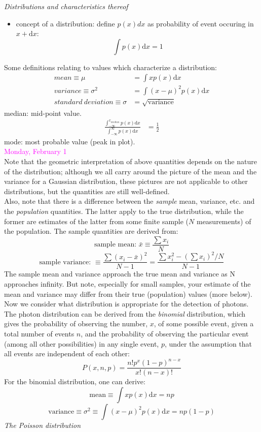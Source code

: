 \documentclass[12pt]{article}
\begin{document}
\noindent \emph{Distributions and characteristics thereof}
\begin{itemize}
    \item concept of a distribution: define $p(x)dx$ as probability of
    event occuring in $x + \textrm{d}x$:
        $$ \int p(x)\textrm{d}x = 1 $$
\end{itemize}
Some definitions relating to values which characterize a distribution:
\begin{align*}
    mean \equiv \mu &= \int xp(x)\textrm{d}x \\
    variance \equiv \sigma^2 &= \int (x-\mu)^2 p(x)\textrm{d}x \\
    standard\ deviation \equiv \sigma &= \sqrt{\textrm{variance}}
\end{align*}
median: mid-point value.
\begin{align*}
    \frac{ \int_{-\infty}^{x_{median}} p(x)\textrm{d}x }
    { \int_{-\infty}^{\infty} p(x)\textrm{d}x }
    &= \frac{1}{2}
\end{align*}
mode: most probable value (peak in plot).\\

\noindent \textcolor{magenta}{Monday, February 1}\\

\noindent Note that the geometric interpretation of above quantities
depends on the nature of the distribution; although we all carry
around the picture of the mean and the variance for a Gaussian
distribution, these pictures are not applicable to other
distributions, but the quantities are still well-defined.\\

\noindent Also, note that there is a difference between the
\emph{sample}
mean, variance, etc. and the \emph{population} quantities. The latter apply
to the true distribution, while the former are estimates of the latter
from some finite sample ($N$ measurements) of the population. The sample
quantities are derived from:
$$\textrm{sample\ mean:\ } \bar{x} \equiv \frac{\sum x_i}{N}$$
$$\textrm{sample\ variance:\ } \equiv
  \frac{\sum (x_i-\bar{x})^2}{N-1} = 
  \frac{\sum x_i^2-(\sum x_i)^2/N}{N-1}$$
The sample mean and variance approach the true mean and variance as N
approaches infinity. But note, especially for small samples, your
estimate of the mean and variance may differ from their true
(population) values (more below).\\

\noindent Now we consider what distribution is appropriate for the
detection of photons. The photon distribution can be derived from the
\emph{binomial} distribution, which gives the probability of observing the
number, $x$, of some possible event, given a total number of events $n$,
and the probability of observing the particular event (among all other
possibilities) in any single event, $p$, under the assumption that all
events are independent of each other:
   $$ P(x,n,p) = \frac{n!p^x(1-p)^{n-x}}{x!(n-x)!}  $$
For the binomial distribution, one can derive:
   $$ \textrm{mean} \equiv \int xp(x)\textrm{d}x = np $$
   $$ \textrm{variance} \equiv \sigma^2 \equiv 
      \int (x-\mu)^2p(x)\textrm{d}x = np(1-p) $$
\emph{The Poisson distribution}\\
\end{document}
